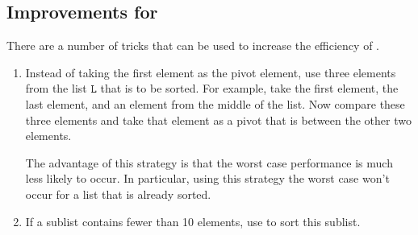 \subsection{Improvements for }
There are a number of tricks that can be used to increase the efficiency of .
\begin{enumerate}
\item Instead of taking the first element as the pivot element, use three elements from the list
      $\mathtt{L}$ that is to be sorted.  For example, take the first element, the last element, and an
      element from the middle of the list.  Now compare these three elements and take that element as
      a pivot that is between the other two elements.

      The advantage of this strategy is that the worst case performance is much less likely to occur.  In
      particular,  using this strategy the worst case won't occur for a list that is already
      sorted.
\item If a sublist contains fewer than 10 elements, use  to sort this sublist.


\end{enumerate}
